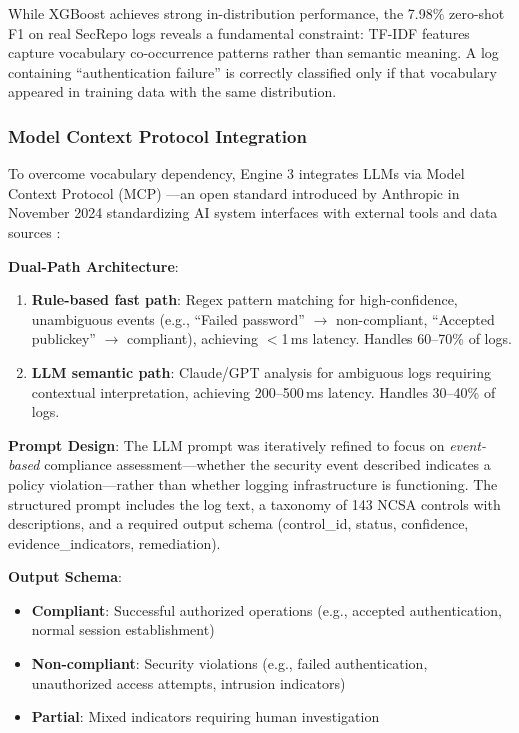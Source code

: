 \documentclass[11pt,conference]{IEEEtran}
\begin{document}
While XGBoost achieves strong in-distribution performance, the 7.98\% zero-shot F1 on real SecRepo logs reveals a fundamental constraint: TF-IDF features capture vocabulary co-occurrence patterns rather than semantic meaning. A log containing ``authentication failure'' is correctly classified only if that vocabulary appeared in training data with the same distribution.

\subsubsection{Model Context Protocol Integration}

To overcome vocabulary dependency, Engine 3 integrates LLMs via Model Context Protocol (MCP) \cite{mcp_anthropic, mcp_spec}---an open standard introduced by Anthropic in November 2024 standardizing AI system interfaces with external tools and data sources \cite{mcp_landscape}:

\textbf{Dual-Path Architecture}:
\begin{enumerate}
    \item \textbf{Rule-based fast path}: Regex pattern matching for high-confidence, unambiguous events (e.g., ``Failed password'' $\rightarrow$ non-compliant, ``Accepted publickey'' $\rightarrow$ compliant), achieving $<$1\,ms latency. Handles 60--70\% of logs.
    \item \textbf{LLM semantic path}: Claude/GPT analysis for ambiguous logs requiring contextual interpretation, achieving 200--500\,ms latency. Handles 30--40\% of logs.
\end{enumerate}

\textbf{Prompt Design}: The LLM prompt was iteratively refined to focus on \textit{event-based} compliance assessment---whether the security event described indicates a policy violation---rather than whether logging infrastructure is functioning. The structured prompt includes the log text, a taxonomy of 143 NCSA controls with descriptions, and a required output schema (control\_id, status, confidence, evidence\_indicators, remediation).

\textbf{Output Schema}:
\begin{itemize}
    \item \textbf{Compliant}: Successful authorized operations (e.g., accepted authentication, normal session establishment)
    \item \textbf{Non-compliant}: Security violations (e.g., failed authentication, unauthorized access attempts, intrusion indicators)
    \item \textbf{Partial}: Mixed indicators requiring human investigation
\end{itemize}
\end{document}
